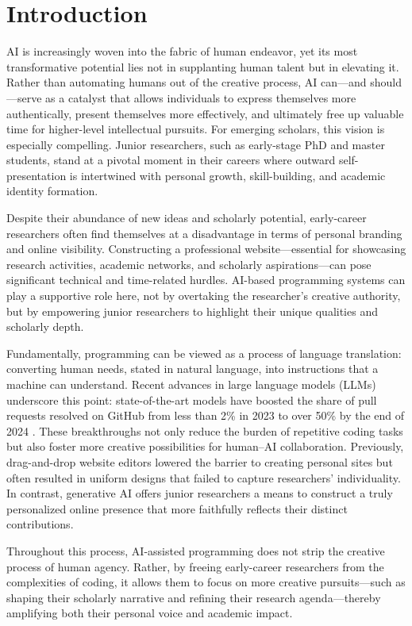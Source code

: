 \section{Introduction}
\label{sec:intro}

AI is increasingly woven into the fabric of human endeavor, yet its most transformative potential lies not in supplanting human talent but in elevating it. Rather than automating humans out of the creative process, AI can—and should—serve as a catalyst that allows individuals to express themselves more authentically, present themselves more effectively, and ultimately free up valuable time for higher-level intellectual pursuits. For emerging scholars, this vision is especially compelling. Junior researchers, such as early-stage PhD and master students, stand at a pivotal moment in their careers where outward self-presentation is intertwined with personal growth, skill-building, and academic identity formation.

Despite their abundance of new ideas and scholarly potential, early-career researchers often find themselves at a disadvantage in terms of personal branding and online visibility. Constructing a professional website—essential for showcasing research activities, academic networks, and scholarly aspirations—can pose significant technical and time-related hurdles. AI-based programming systems can play a supportive role here, not by overtaking the researcher's creative authority, but by empowering junior researchers to highlight their unique qualities and scholarly depth.

Fundamentally, programming can be viewed as a process of language translation: converting human needs, stated in natural language, into instructions that a machine can understand. Recent advances in large language models (LLMs) underscore this point: state-of-the-art models have boosted the share of pull requests resolved on GitHub from less than 2\% in 2023 to over 50\% by the end of 2024 \cite{jimenez2024swebench}. These breakthroughs not only reduce the burden of repetitive coding tasks but also foster more creative possibilities for human–AI collaboration. Previously, drag-and-drop website editors lowered the barrier to creating personal sites but often resulted in uniform designs that failed to capture researchers’ individuality. In contrast, generative AI offers junior researchers a means to construct a truly personalized online presence that more faithfully reflects their distinct contributions.

Throughout this process, AI-assisted programming does not strip the creative process of human agency. Rather, by freeing early-career researchers from the complexities of coding, it allows them to focus on more creative pursuits—such as shaping their scholarly narrative and refining their research agenda—thereby amplifying both their personal voice and academic impact.

